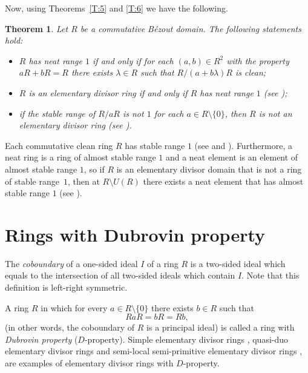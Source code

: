 \documentclass[10pt,a4paper]{amsart}
\theoremstyle{plain}
\newtheorem{theorem}{Theorem}
\theoremstyle{definition}
\begin{document}
Now, using  Theorems~\ref{T:5} and  \ref{T:6} we have the following.

\begin{theorem}\label{T:7}
Let $R$ be a commutative B\'ezout domain. The following statements hold:
\begin{itemize}
\item[(i)] $R$ has neat range\/ $1$ if and only if for each $(a,b)\in R^2$ with the property  $aR+bR=R$ there exists $\lambda\in R$ such that $R/(a+b\lambda)R$ is clean;

\item[(ii)] $R$ is an elementary divisor ring if and only if\/ $R$ has neat range $1$ (see \cite[Theorem 33]{9-zabavsky});

\item[(iii)] if the stable range of\/ $R/aR$ is not\/ $1$ for each $a\in R\setminus\{0\}$,  then $R$ is not an elementary divisor ring
(see \cite[Theorem 5]{10-zabgat}).
\end{itemize}
\end{theorem}

Each  commutative clean ring $R$ has stable range $1$ (see  \cite[p.\,244]{6-mcGovern} and \cite[Proposition 1.8]{Nicholson_77}).
Furthermore, a neat ring is a ring of almost stable range $1$ and a neat element is an element of almost stable range $1$, so  if $R$ is an elementary divisor domain that is not a ring of stable range~$1$, then at $R\setminus U(R)$ there exists a neat element that has  almost stable range $1$
(see \cite[Theorem~7]{11-zabavsky}).

\section{Rings with Dubrovin property}

The {\it coboundary}  of a one-sided ideal $I$ of a ring $R$ is a  two-sided ideal which equals to the intersection of all two-sided ideals which contain $I$.     Note that this definition is  left-right symmetric.

A ring $R$ in  which for every   $a\in R\setminus\{0\}$ there exists  $b\in R$ such that
\begin{equation}\label{OOOjggT}
RaR=bR=Rb,
\end{equation}
(in other words, the  coboundary of $R$ is a   principal ideal) is called  a ring with {\it Dubrovin property} ($D$-property). Simple elementary divisor rings \cite[Section 4.2]{12-zabavsky},  quasi-duo elementary divisor rings \cite[Theorem 1]{15-Bowtell_Cohn} and  semi-local   semi-primitive elementary divisor rings \cite[Theorem 1]{14-dubrovin},
\cite{dubrovin_plus}  are examples of elementary divisor rings with $D$-property.
\end{document}
